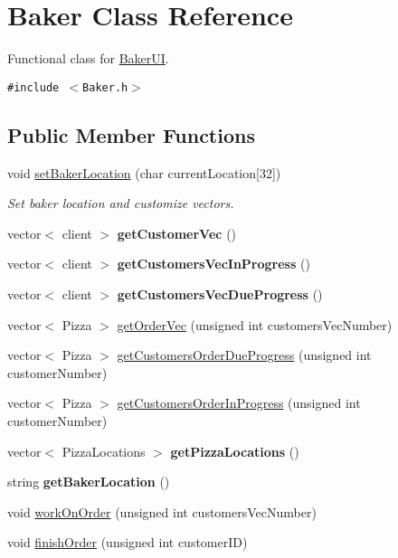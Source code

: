 \hypertarget{class_baker}{
\section{Baker Class Reference}
\label{class_baker}
}
Functional class for \hyperlink{class_baker_u_i}{Baker\-UI}.  


{\tt \#include $<$Baker.h$>$}

\subsection*{Public Member Functions}
\begin{CompactItemize}
\item 
void \hyperlink{class_baker_b85151ecb20282d81b4dab489fea7dd8}{set\-Baker\-Location} (char current\-Location\mbox{[}32\mbox{]})
\begin{CompactList}\small\item\em Set baker location and customize vectors. \item\end{CompactList}\item 
\hypertarget{class_baker_3970b0afe27b514282442b11592e1602}{
vector$<$ client $>$ {\bf get\-Customer\-Vec} ()}
\label{class_baker_3970b0afe27b514282442b11592e1602}

\item 
\hypertarget{class_baker_8b798f098bfd9a23b11fa1d63d089609}{
vector$<$ client $>$ {\bf get\-Customers\-Vec\-In\-Progress} ()}
\label{class_baker_8b798f098bfd9a23b11fa1d63d089609}

\item 
\hypertarget{class_baker_4c05936fa38e14b768511921a3288c57}{
vector$<$ client $>$ {\bf get\-Customers\-Vec\-Due\-Progress} ()}
\label{class_baker_4c05936fa38e14b768511921a3288c57}

\item 
vector$<$ Pizza $>$ \hyperlink{class_baker_ad0cbeddec394b25c5eade57247f4110}{get\-Order\-Vec} (unsigned int customers\-Vec\-Number)
\item 
vector$<$ Pizza $>$ \hyperlink{class_baker_7c9256e53372bd3a698e40cf64003c50}{get\-Customers\-Order\-Due\-Progress} (unsigned int customer\-Number)
\item 
vector$<$ Pizza $>$ \hyperlink{class_baker_96a7c1ec2dc23919a4e7ca8c399476e1}{get\-Customers\-Order\-In\-Progress} (unsigned int customer\-Number)
\item 
\hypertarget{class_baker_3d38e7498fba59674c7d3838bf4c1824}{
vector$<$ Pizza\-Locations $>$ {\bf get\-Pizza\-Locations} ()}
\label{class_baker_3d38e7498fba59674c7d3838bf4c1824}

\item 
\hypertarget{class_baker_363b0d0c242923ca3a76ebd4e608cc2d}{
string {\bf get\-Baker\-Location} ()}
\label{class_baker_363b0d0c242923ca3a76ebd4e608cc2d}

\item 
void \hyperlink{class_baker_9616413c80f3814907a9c2399ac50438}{work\-On\-Order} (unsigned int customers\-Vec\-Number)
\item 
void \hyperlink{class_baker_222a16bf113b70cbe0388a7291978a57}{finish\-Order} (unsigned int customer\-ID)
\end{CompactItemize}
